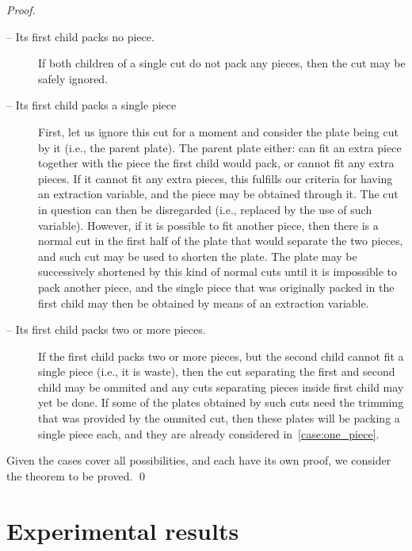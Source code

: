 \documentclass[runningheads]{llncs}
\begin{document}
\begin{proof}
\begin{description}
\item[ -- Its first child packs no piece.] 
If both children of a single cut do not pack any pieces, then the cut may be safely ignored.
\item[ -- Its first child packs a single piece]
First, let us ignore this cut for a moment and consider the plate being cut by it (i.e., the parent plate).
The parent plate either: can fit an extra piece together with the piece the first child would pack, or cannot fit any extra pieces.
If it cannot fit any extra pieces, this fulfills our criteria for having an extraction variable, and the piece may be obtained through it.
The cut in question can then be disregarded (i.e., replaced by the use of such variable).
However, if it is possible to fit another piece, then there is a normal cut in the first half of the plate that would separate the two pieces, and such cut may be used to shorten the plate.
The plate may be successively shortened by this kind of normal cuts until it is impossible to pack another piece, and the single piece that was originally packed in the first child may then be obtained by means of an extraction variable.
\item[ -- Its first child packs two or more pieces.]
If the first child packs two or more pieces, but the second child cannot fit a single piece (i.e., it is waste), then the cut separating the first and second child may be ommited and any cuts separating pieces inside first child may yet be done.
If some of the plates obtained by such cuts need the trimming that was provided by the ommited cut, then these plates will be packing a single piece each, and they are already considered in~\cref{case:one_piece}.
\end{description}

Given the cases cover all possibilities, and each have its own proof, we consider the theorem to be proved. \qed

\end{proof}

\section{Experimental results}
\end{document}
